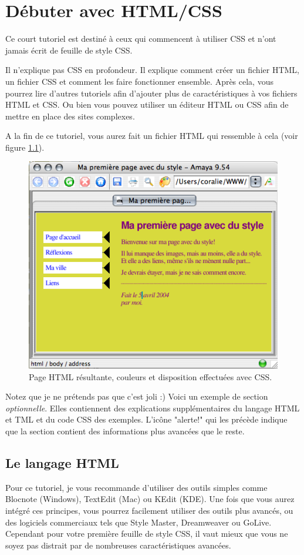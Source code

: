 
\chapter{Débuter avec HTML/CSS}
Ce court tutoriel est destiné à  ceux qui commencent à  utiliser CSS et n'ont jamais écrit de feuille de style CSS.

Il n'explique pas CSS en profondeur. Il explique comment créer un fichier HTML, un fichier CSS et comment les faire fonctionner ensemble. Après cela, vous pourrez lire d'autres tutoriels afin d'ajouter plus de caractéristiques à  vos fichiers HTML et CSS. Ou bien vous pouvez utiliser un éditeur HTML ou CSS afin de mettre en place des sites complexes.

A la fin de ce tutoriel, vous aurez fait un fichier HTML qui ressemble à cela (voir figure \ref{fig:screen1}). 

\begin{figure}[h]
	\begin{center}
		\includegraphics{voronin/img/capture5.png}	
		\caption{Page HTML résultante, couleurs et disposition effectuées avec CSS.}
		\label{fig:screen1}
	\end{center}
\end{figure}
Notez que je ne prétends pas que c'est joli :)
Voici un exemple de section \emph{optionnelle}. Elles contiennent des explications supplémentaires du langage HTML et TML et du code CSS des exemples. L'icône "alerte!" qui les précède indique que la section contient des informations plus avancées que le reste.
\normalsize
\section{Le langage HTML}
Pour ce tutoriel, je vous recommande d'utiliser des outils simples comme Blocnote (Windows), TextEdit (Mac) ou KEdit (KDE). Une fois que vous aurez intégré ces principes, vous pourrez facilement utiliser des outils plus avancés, ou des logiciels commerciaux tels que Style Master, Dreamweaver ou GoLive. Cependant pour votre première feuille de style CSS, il vaut mieux que vous ne soyez pas distrait par de nombreuses caractéristiques avancées.

